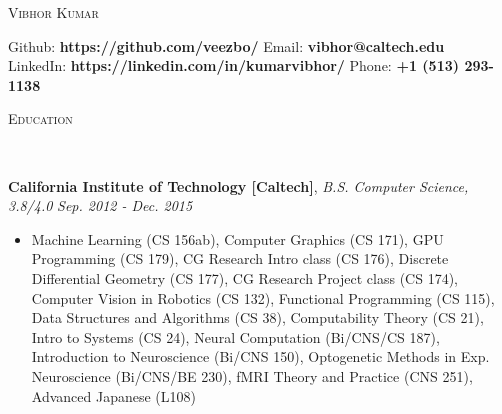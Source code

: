 \documentclass[9pt]{article}
\newenvironment{changemargin}[2]{%
  \begin{list}{}{%
    \setlength{\topsep}{0pt}%
    \setlength{\leftmargin}{#1}%
    \setlength{\rightmargin}{#2}%
    \setlength{\listparindent}{\parindent}%
    \setlength{\itemindent}{\parindent}%
    \setlength{\parsep}{\parskip}%
  }%
  \item[]}{\end{list}
}
\newcommand{\lineover}{
	\begin{changemargin}{-0.05in}{-0.05in}
		\vspace*{-8pt}
		\hrulefill \\
		\vspace*{-2pt}
	\end{changemargin}
}
\newcommand{\header}[1]{
	\begin{changemargin}{-0.5in}{-0.5in}
		\scshape{#1}\\
  	\lineover
	\end{changemargin}
}
\newenvironment{body} {
	\vspace*{-16pt}
	\begin{changemargin}{-0.25in}{-0.5in}
  }	
	{\end{changemargin}
}
\begin{document}
\begin{center} 
	{\Large \scshape Vibhor Kumar} 
\end{center}
	\vspace*{-2pt}
\hspace{-12mm} Github: \hspace{3mm} \textbf{https://github.com/veezbo/}
\hspace{46mm} Email: \hspace{0.1mm} \textbf{vibhor@caltech.edu} \\
\vspace*{1pt}
\hspace{-12mm} LinkedIn: \hspace{0.25mm} \textbf{https://linkedin.com/in/kumarvibhor/} \hspace{26.75mm} Phone: \textbf{+1 (513) 293-1138}\\
\vspace{1pt}
\smallskip
\header{Education}
\begin{body}
	\vspace{16pt}
	\textbf{California Institute of Technology [Caltech]}{}, \emph{B.S. Computer Science, 3.8/4.0} \hfill \emph{Sep. 2012 - Dec. 2015}{} \\
	\vspace{-3pt}
	\begin{itemize} \itemsep -0pt
	\item Machine Learning (CS 156ab), Computer Graphics (CS 171), GPU Programming (CS 179), CG Research Intro class (CS 176), Discrete Differential Geometry (CS 177), CG Research Project class (CS 174), Computer Vision in Robotics (CS 132), Functional Programming (CS 115), Data Structures and Algorithms (CS 38), Computability Theory (CS 21), Intro to Systems (CS 24), Neural Computation (Bi/CNS/CS 187), Introduction to Neuroscience (Bi/CNS 150), Optogenetic Methods in Exp. Neuroscience (Bi/CNS/BE 230), fMRI Theory and Practice (CNS 251), Advanced Japanese (L108)
	\end{itemize}
\end{body}
\end{document}
